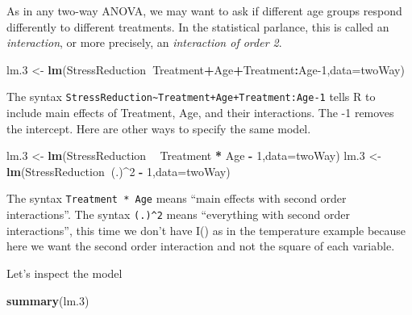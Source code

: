 \documentclass[]{book}
\newenvironment{Shaded}{\begin{snugshade}}{\end{snugshade}}
\newcommand{\DataTypeTok}[1]{\textcolor[rgb]{0.13,0.29,0.53}{#1}}
\newcommand{\DecValTok}[1]{\textcolor[rgb]{0.00,0.00,0.81}{#1}}
\newcommand{\FloatTok}[1]{\textcolor[rgb]{0.00,0.00,0.81}{#1}}
\newcommand{\KeywordTok}[1]{\textcolor[rgb]{0.13,0.29,0.53}{\textbf{#1}}}
\newcommand{\NormalTok}[1]{#1}
\newcommand{\OperatorTok}[1]{\textcolor[rgb]{0.81,0.36,0.00}{\textbf{#1}}}
\newcommand{\StringTok}[1]{\textcolor[rgb]{0.31,0.60,0.02}{#1}}
\theoremstyle{definition}
\theoremstyle{definition}
\theoremstyle{definition}
\theoremstyle{remark}
\begin{document}
As in any two-way ANOVA, we may want to ask if different age groups respond differently to different treatments.
In the statistical parlance, this is called an \emph{interaction}, or more precisely, an \emph{interaction of order 2}.

\begin{Shaded}
\begin{Highlighting}[]
\NormalTok{lm}\FloatTok{.3}\NormalTok{ <-}\StringTok{ }\KeywordTok{lm}\NormalTok{(StressReduction}\OperatorTok{~}\NormalTok{Treatment}\OperatorTok{+}\NormalTok{Age}\OperatorTok{+}\NormalTok{Treatment}\OperatorTok{:}\NormalTok{Age}\DecValTok{-1}\NormalTok{,}\DataTypeTok{data=}\NormalTok{twoWay)}
\end{Highlighting}
\end{Shaded}

The syntax \texttt{StressReduction\textasciitilde{}Treatment+Age+Treatment:Age-1} tells R to include main effects of Treatment, Age, and their interactions. The -1 removes the intercept.
Here are other ways to specify the same model.

\begin{Shaded}
\begin{Highlighting}[]
\NormalTok{lm}\FloatTok{.3}\NormalTok{ <-}\StringTok{ }\KeywordTok{lm}\NormalTok{(StressReduction }\OperatorTok{~}\StringTok{ }\NormalTok{Treatment }\OperatorTok{*}\StringTok{ }\NormalTok{Age }\OperatorTok{-}\StringTok{ }\DecValTok{1}\NormalTok{,}\DataTypeTok{data=}\NormalTok{twoWay)}
\NormalTok{lm}\FloatTok{.3}\NormalTok{ <-}\StringTok{ }\KeywordTok{lm}\NormalTok{(StressReduction}\OperatorTok{~}\NormalTok{(.)}\OperatorTok{^}\DecValTok{2} \OperatorTok{-}\StringTok{ }\DecValTok{1}\NormalTok{,}\DataTypeTok{data=}\NormalTok{twoWay)}
\end{Highlighting}
\end{Shaded}

The syntax \texttt{Treatment\ *\ Age} means ``main effects with second order interactions''.
The syntax \texttt{(.)\^{}2} means ``everything with second order interactions'', this time we don't have I() as in the temperature example because here we want the second order interaction and not the square of each variable.

Let's inspect the model

\begin{Shaded}
\begin{Highlighting}[]
\KeywordTok{summary}\NormalTok{(lm}\FloatTok{.3}\NormalTok{)}
\end{Highlighting}
\end{Shaded}
\end{document}
